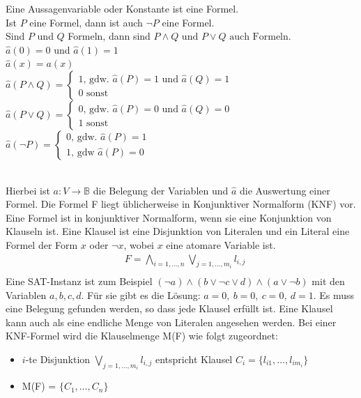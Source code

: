 \documentclass[a4,abstract=on]{scrartcl}
\begin{document}
\begin{mdframed} [linecolor=black,linewidth=2pt]
Eine Aussagenvariable oder Konstante ist eine Formel.\\
Ist $P$ eine Formel, dann ist auch  $\neg P$  eine Formel.\\
Sind $P$ und  $Q$  Formeln, dann sind
$P \wedge Q  \text{ und }  P \vee Q \text{ auch Formeln.}$\\
$\hat{a}(0)=0$ und $\hat{a}(1)=1$\\
$\hat{a}(x)=a(x)$\\
$\hat{a}(P\wedge Q) = \begin{cases}1 \text{, gdw. } \hat{a}(P) = 1 \text{ und } \hat{a}(Q)=1\\ 0 \text{ sonst}\end{cases}$\\
$\hat{a}(P\vee Q) = \begin{cases}0 \text{, gdw. } \hat{a}(P) = 0 \text{ und } \hat{a}(Q)=0\\ 1 \text{ sonst}\end{cases}$\\
$\hat{a}(\neg P) = \begin{cases}0 \text{, gdw. } \hat{a}(P) = 1 \\ 1 \text{, gdw } \hat{a}(P) = 0\end{cases}$
\end{mdframed}
\ \\
Hierbei ist $a:V\rightarrow \mathbb{B}$ die Belegung der Variablen und $\hat{a}$ die Auswertung einer Formel.
Die Formel F liegt üblicherweise in Konjunktiver Normalform (KNF) vor. Eine Formel ist in konjunktiver Normalform, wenn sie eine Konjunktion von Klauseln ist. Eine Klausel ist eine Disjunktion von Literalen und ein Literal eine Formel der Form $x$ oder $\neg x$, wobei $x$ eine atomare Variable ist.\\
\begin{align*}
&F = \bigwedge_{i=1, \dots ,n} \bigvee_{j=1,\dots ,m_i}{l_{i,j}}\\
\end{align*}
Eine SAT-Instanz ist zum Beispiel $(\neg a) \wedge (b \vee \neg c \vee d) \wedge (a \vee \neg b)$ mit den Variablen $a,b,c,d$. Für sie gibt es die Lösung: $a = 0,{~} b = 0,{~} c= 0, {~} d = 1$. Es muss eine Belegung gefunden werden, so dass jede Klausel erfüllt ist.
Eine Klausel kann auch als eine endliche Menge von Literalen angesehen werden. Bei einer KNF-Formel wird die Klauselmenge M(F) wie folgt zugeordnet:\\
\begin{itemize}
\item $i$-te Disjunktion $\bigvee_{j=1,\dots ,m_i}{l_{i,j}}$ entspricht Klausel $C_i = \{l_{i1}, \dots, l_{im_i}\}$
\item M(F) = $\{C_1, \dots, C_n\}$
\end{itemize}
\end{document}
